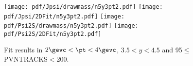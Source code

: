 \begin{figure}[H]
\begin{center}
\texttt{[image: pdf/Jpsi/drawmass/n5y3pt2.pdf]}
\texttt{[image: pdf/Jpsi/2DFit/n5y3pt2.pdf]}
\vspace*{-0.5cm}
\texttt{[image: pdf/Psi2S/drawmass/n5y3pt2.pdf]}
\texttt{[image: pdf/Psi2S/2DFit/n5y3pt2.pdf]}
\vspace*{-0.5cm}
\end{center}
\caption{Fit results in $2\gevc<\pt<4\gevc$, $3.5<y<4.5$ and 95$\leq$PVNTRACKS$<$200.}
\label{Fitn5y3pt2}
\end{figure}
